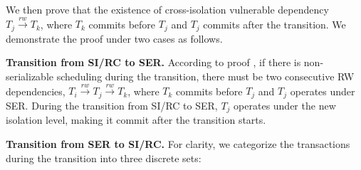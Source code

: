 { We then prove that the existence of cross-isolation vulnerable dependency $T_j \xrightarrow{rw} T_k$, where $T_k$ commits before $T_j$ and $T_j$ commits after the transition. 
We demonstrate the proof under two cases as follows. 




\noindent\textbf{Transition from SI/RC to SER.} According to proof , if there is non-serializable scheduling during the transition, there must be two consecutive RW dependencies, $T_i \xrightarrow{rw} T_j \xrightarrow{rw} T_k$, where $T_k$ commits before $T_j$ and $T_j$ operates under SER. During the transition from SI/RC to SER, $T_j$ operates under the new isolation level, making it commit after the transition starts. 

\noindent\textbf{Transition from SER to SI/RC.} For clarity, we categorize the transactions during the transition into three discrete sets:


}
